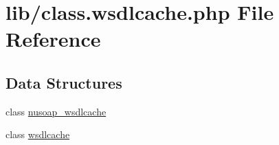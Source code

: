 \hypertarget{class_8wsdlcache_8php}{}\section{lib/class.wsdlcache.\+php File Reference}
\label{class_8wsdlcache_8php}
\subsection*{Data Structures}
\begin{DoxyCompactItemize}
\item 
class \hyperlink{classnusoap__wsdlcache}{nusoap\+\_\+wsdlcache}
\item 
class \hyperlink{classwsdlcache}{wsdlcache}
\end{DoxyCompactItemize}

